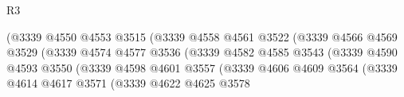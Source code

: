 \begin{lexlean}{R3}
\begin{coremodule}
                                                  (@3339
                                                    @4550
                                                    @4553
                                                    @3515
                                                    (@3339
                                                      @4558
                                                      @4561
                                                      @3522
                                                      (@3339
                                                        @4566
                                                        @4569
                                                        @3529
                                                        (@3339
                                                          @4574
                                                          @4577
                                                          @3536
                                                          (@3339
                                                            @4582
                                                            @4585
                                                            @3543
                                                            (@3339
                                                              @4590
                                                              @4593
                                                              @3550
                                                              (@3339
                                                                @4598
                                                                @4601
                                                                @3557
                                                                (@3339
                                                                  @4606
                                                                  @4609
                                                                  @3564
                                                                  (@3339
                                                                    @4614
                                                                    @4617
                                                                    @3571
                                                                    (@3339
                                                                      @4622
                                                                      @4625
                                                                      @3578

\end{coremodule}
\end{lexlean}
